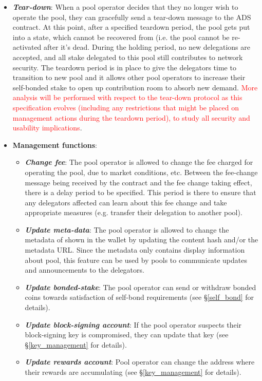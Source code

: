 \begin{itemize}
    \item \textbf{\textit{Tear-down}}: When a pool operator decides that they no longer wish to operate the pool, they can gracefully send a tear-down message to the ADS contract. At this point, after a specified teardown period, the pool gets put into a  state, which cannot be recovered from (i.e. the pool cannot be re-activated after it's dead. During the holding period, no new delegations are accepted, and all stake delegated to this pool still contributes to network security. The teardown period is in place to give the delegators time to transition to new pool and it allows other pool operators to increase their self-bonded stake to open up contribution room to absorb new demand. \textcolor{red}{More analysis will be performed with respect to the tear-down protocol as this specification evolves (including any restrictions that might be placed on management actions during the teardown period), to study all security and usability implications}.
    \item \textbf{Management functions}:
    \begin{itemize}
        \item \textbf{\textit{Change fee}}: The pool operator is allowed to change the fee charged for operating the pool, due to market conditions, etc. Between the fee-change message being received by the contract and the fee change taking effect, there is a delay period to be specified. This period is there to ensure that any delegators affected can learn about this fee change and take appropriate measures (e.g. transfer their delegation to another pool).
        \item \textbf{\textit{Update meta-data}}: The pool operator is allowed to change the metadata of shown in the wallet by updating the content hash and/or the metadata URL. Since the metadata only contains display information about pool, this feature can be used by pools to communicate updates and announcements to the delegators. 
        \item \textbf{\textit{Update bonded-stake}}: The pool operator can send or withdraw bonded coins towards satisfaction of self-bond requirements (see \S\ref{self_bond} for details). 
        \item \textbf{\textit{Update block-signing account}}: If the pool operator suspects their block-signing key is compromised, they can update that  key (see \S\ref{key_management} for details). 
        \item \textbf{\textit{Update rewards account}}: Pool operator can change the address where their rewards are accumulating (see \S\ref{key_management} for details). 
    \end{itemize}
\end{itemize}

